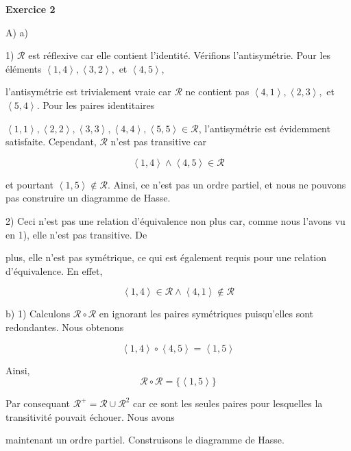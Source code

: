 \documentclass{article}
\newcommand{\tuple}[1]{\ensuremath{\left\langle #1 \right\rangle}}
\begin{document}
    
\textbf{Exercice 2}

\vspace{0.3cm}
A) a) 

1) $\mathcal{R}$ est réflexive car elle contient l'identité. Vérifions l'antisymétrie. Pour les éléments $\tuple{1,4}, \tuple{3,2},$ et $\tuple{4,5}$, 

l'antisymétrie est trivialement vraie car $\mathcal{R}$ ne contient pas $\tuple{4,1}, \tuple{2,3},$ et $\tuple{5,4}$. Pour les paires identitaires 

$\tuple{1, 1}, \tuple{2, 2}, \tuple{3, 3}, \tuple{4, 4}, \tuple{5, 5} \in \mathcal{R}$, l'antisymétrie est évidemment satisfaite. Cependant, $\mathcal{R}$ n'est pas transitive car 

$$ \tuple{1,4} \land \tuple{4,5} \in \mathcal{R}$$

et pourtant $ \tuple{1,5} \notin \mathcal{R}.$ Ainsi, ce n'est pas un ordre partiel, et nous ne pouvons pas construire un diagramme de Hasse.

\vspace{0.5cm}

2)
Ceci n'est pas une relation d'équivalence non plus car, comme nous l'avons vu en 1), elle n'est pas transitive. De 

plus, elle n'est pas symétrique, ce qui est également requis pour une relation d'équivalence. En effet,

$$ \tuple{1,4} \in \mathcal{R} \land \tuple{4,1} \notin \mathcal{R}$$

\vspace{0.5cm}

b) 1) Calculons $\mathcal{R} \circ \mathcal{R}$ en ignorant les paires symétriques puisqu'elles sont redondantes. Nous obtenons 

$$ \tuple{1,4} \circ \tuple{4,5} = \tuple{1,5} $$

Ainsi, $$ \mathcal{R} \circ \mathcal{R} = \{ \tuple{1,5} \}$$

Par consequant $\mathcal{R}^+ = \mathcal{R} \cup \mathcal{R}^2 $ car ce sont les seules paires pour lesquelles la transitivité pouvait échouer. Nous avons 

maintenant un ordre partiel. Construisons le diagramme de Hasse.

\begin{center}
    \begin{minipage}{0.3\textwidth}
    \end{minipage}
\end{center}
\end{document}
